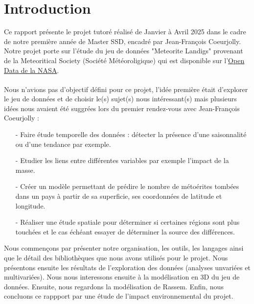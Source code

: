 \documentclass[12pt]{article}
\begin{document}
\section{Introduction}
Ce rapport présente le projet tutoré réalisé de Janvier à Avril 2025 dans le cadre de notre première année de Master SSD, encadré par Jean-François Coeurjolly.  Notre projet porte sur l'étude du jeu de données "Meteorite Landigs" provenant de la Meteoritical Society (Société Météoroligique) qui est disponible sur l'\href{https://data.nasa.gov/Space-Science/Meteorite-Landings/gh4g-9sfh/about_data}{\underline{Open Data de la NASA}}.\\
\\
Nous n'avions pas d'objectif défini pour ce projet, l'idée première était d'explorer le jeu de données et de choisir le(s) sujet(s) nous intéressant(s)  mais plusieurs idées nous avaient été suggrées lors du premier rendez-vous avec Jean-François Coeurjolly :\\
\begin{itemize}
	\item[-] Faire étude temporelle des données : détecter la présence d'une saisonnalité ou d'une tendance par exemple.\\
	\item[-] Etudier les liens entre différentes variables par exemple l'impact de la masse.\\
	\item[-]Créer un modèle permettant de prédire le nombre de métoérites tombées dans un pays à partir de sa superficie, ses coordonnées de latitude et 		longitude.\\
	\item[-] Réaliser une étude spatiale pour déterminer si certaines régions sont plus touchées et le cas échéant essayer de déterminer la source des différences.\\
\end{itemize}
Nous commençons par présenter notre organisation, les outils, les langages ainsi que le détail des bibliothèques que nous avons utilisés pour le projet. Nous présentons ensuite les résultats de l'exploration des données (analyses unvariées et multivariées). Nous nous interessons ensuite à la modélisation en 3D du jeu de données. Ensuite, nous regardons la modélisation de Rassem. Enfin, nous concluons ce rappport par une étude de l'impact environnemental du projet. \\
\\
\end{document}
